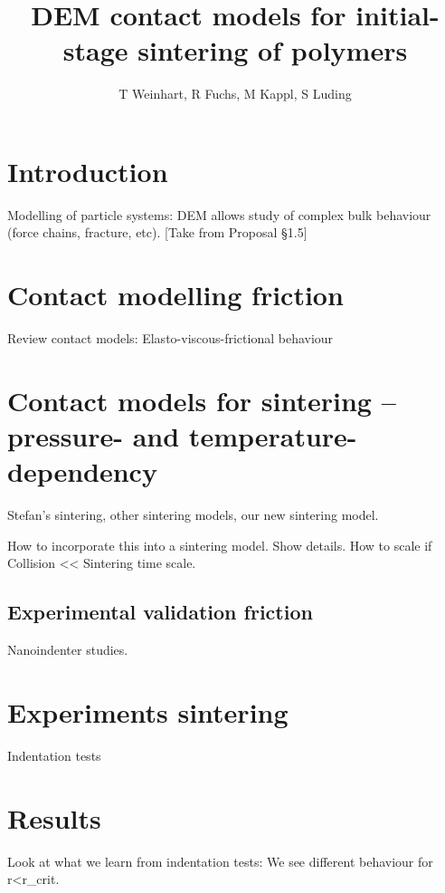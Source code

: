 \documentclass[graybox, envcountchap]{svmult}
\begin{document}
\title{DEM contact models for initial-stage sintering of polymers}
\author{T Weinhart, R Fuchs, M Kappl, S Luding}
\maketitle


\section{Introduction}
Modelling of particle systems: DEM allows study of complex bulk behaviour (force chains, fracture, etc). [Take from Proposal \S1.5]

\section{Contact modelling friction}
Review contact models: Elasto-viscous-frictional behaviour

\section{Contact models for sintering -- pressure- and temperature- dependency}
Stefan's sintering, other sintering models, our new sintering model.

How to incorporate this into a sintering model. Show details. How to scale if Collision << Sintering time scale. 


\subsection{Experimental validation friction}
Nanoindenter studies.

\section{Experiments sintering}
Indentation tests

\section{Results}
Look at what we learn from indentation tests: We see different behaviour for r<r_crit.
\end{document}
